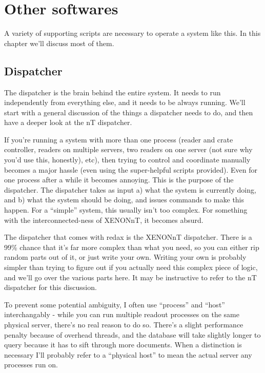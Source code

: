 \chapter{Other softwares}\label{ch:scripts}

A variety of supporting scripts are necessary to operate a system like this.
In this chapter we'll discuss most of them.

\section{Dispatcher}\label{sec:dispatcher}

The dispatcher is the brain behind the entire system.
It needs to run independently from everything else, and it needs to be always running.
We'll start with a general discussion of the things a dispatcher needs to do, and then have a deeper look at the nT dispatcher.

If you're running a system with more than one process (reader and crate controller, readers on multiple servers, two readers on one server (not sure why you'd use this, honestly), etc), then trying to control and coordinate manually becomes a major hassle (even using the super-helpful scripts provided).
Even for one process after a while it becomes annoying.
This is the purpose of the dispatcher.
The dispatcher takes as input a) what the system is currently doing, and b) what the system should be doing, and issues commands to make this happen.
For a ``simple'' system, this usually isn't too complex.
For something with the interconnected-ness of XENONnT, it becomes absurd.

The dispatcher that comes with redax is the XENONnT dispatcher.
There is a 99\% chance that it's far more complex than what you need, so you can either rip random parts out of it, or just write your own.
Writing your own is probably simpler than trying to figure out if you actually need this complex piece of logic, and we'll go over the various parts here.
It may be instructive to refer to the nT dispatcher for this discussion.

To prevent some potential ambiguity, I often use ``process'' and ``host'' interchangably - while you can run multiple readout processes on the same physical server, there's no real reason to do so.
There's a slight performance penalty because of overhead threads, and the database will take slightly longer to query because it has to sift through more documents.
When a distinction is necessary I'll probably refer to a ``physical host'' to mean the actual server any processes run on.

